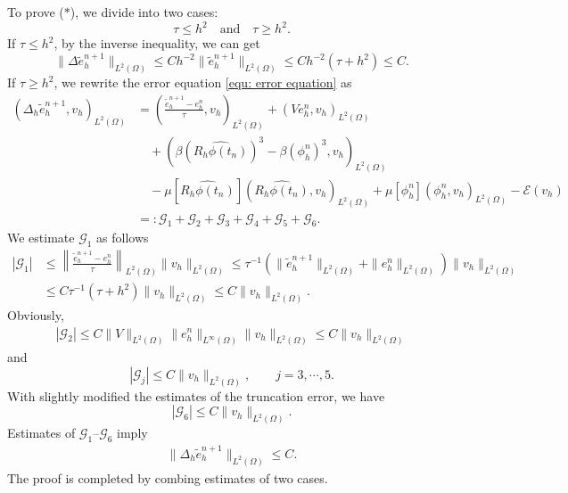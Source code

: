 \documentclass{siamart250211}
\begin{document}
To prove ($*$), we divide into two cases:
\begin{equation*}
	\tau \le h^{2} \quad \text{and} \quad \tau \ge h^{2}.
\end{equation*}
If $\tau \le h^{2}$, by the inverse inequality, we can get 
\begin{equation*}
	\|\Delta \tilde{e}_h^{n+1}\|_{L^2(\Omega)} \le C h^{-2} \|\tilde{e}_h^{n+1}\|_{L^2(\Omega)} \le C h^{-2} (\tau + h^2) \le C.
\end{equation*}
If $\tau \ge h^{2}$, we rewrite the error equation \eqref{equ: error equation} as 
\begin{align*}
	 (\Delta_h \tilde{e}_h^{n+1}, v_h)_{L^2(\Omega)} & = \left( \frac{\tilde{e}_h^{n+1} - e_h^n}{\tau}, v_h \right)_{L^2(\Omega)}   + (V e_h^n, v_h)_{L^2(\Omega)} \\
	 & \quad + (\beta (\widehat{R_h\phi(t_n)})^3 - \beta (\phi_h^n)^3, v_h)_{L^2(\Omega)} \\
	& \quad  - \mu[\widehat{R_h\phi(t_n)}] (\widehat{R_h\phi(t_n)},v_h)_{L^2(\Omega)} + \mu[\phi_h^n] (\phi_h^n,v_h)_{L^2(\Omega)}   - \mathcal{E}(v_h) \\
	& =: \mathcal{G}_1 + \mathcal{G}_2 + \mathcal{G}_3 + \mathcal{G}_4 + \mathcal{G}_5 + \mathcal{G}_6.
\end{align*}
We estimate $\mathcal{G}_1$ as follows 
\begin{align*}
	|\mathcal{G}_1|& \le \left\| \frac{\tilde{e}_h^{n+1} - e_h^n}{\tau} \right\|_{L^2(\Omega)} \|v_h\|_{L^2(\Omega)} \le \tau^{-1} (\|\tilde{e}_h^{n+1}\|_{L^2(\Omega)} + \|e_h^{n}\|_{L^2(\Omega)})\|v_h\|_{L^2(\Omega)} \\
	& \le C \tau^{-1} (\tau + h^2) \|v_h\|_{L^2(\Omega)} \le C \|v_h\|_{L^2(\Omega)}.
\end{align*}
Obviously, 
\begin{align*}
	|\mathcal{G}_2| \le C \|V\|_{L^2(\Omega)}\|e_h^n\|_{L^{\infty}(\Omega)}\|v_h\|_{L^2(\Omega)} \le C \|v_h\|_{L^2(\Omega)} 
\end{align*}
and
\begin{equation*}
	|\mathcal{G}_j| \le C \|v_h\|_{L^2(\Omega)}, \qquad j = 3,\cdots,5.
\end{equation*}
With slightly modified the estimates of the truncation error, we have 
\begin{equation*}
	|\mathcal{G}_6| \le C \|v_h\|_{L^2(\Omega)}.
\end{equation*}
Estimates of $\mathcal{G}_1$--$\mathcal{G}_6$ imply 
\begin{align*}
	\|\Delta_h \tilde{e}_h^{n+1}\|_{L^2(\Omega)} \le C.
\end{align*}
The proof is completed by combing estimates of two cases.
\end{document}
